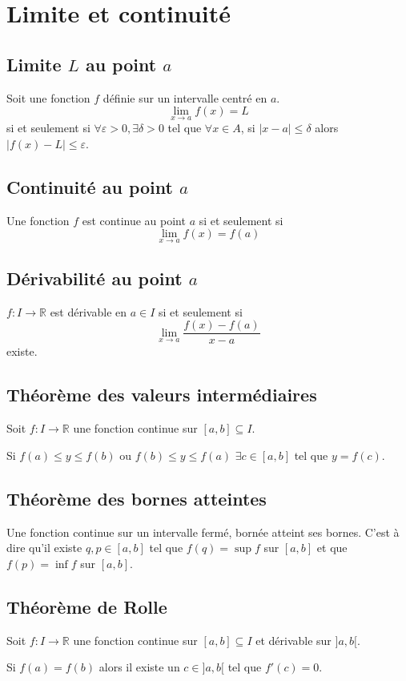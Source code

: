 \section{Limite et continuité}
\subsection{Limite $L$ au point $a$}
Soit une fonction $f$ définie sur un intervalle centré en $a$.
\[ \lim_{x \to a} f(x) = L \]
si et seulement si
$\forall \varepsilon > 0, \exists \delta > 0$ tel que
$\forall x \in A$, si $|x - a| \leq \delta$ alors
$|f(x) - L| \leq \varepsilon$.

\subsection{Continuité au point $a$}
Une fonction $f$ est continue au point $a$ si et seulement si
\[ \lim_{x \to a} f(x) = f(a) \]

\subsection{Dérivabilité au point $a$}
$f : I \to \mathbb{R}$ est dérivable en $a \in I$ si et seulement si
\[ \lim_{x \to a} \frac{f(x) - f(a)}{x - a} \]
existe.

\subsection{Théorème des valeurs intermédiaires}
Soit $f : I \to \mathbb{R}$ une fonction continue sur $[a,b] \subseteq I$.

Si $f(a) \leq y \leq f(b)$ ou $f(b) \leq y \leq f(a)$
$\exists c \in [a,b]$ tel que $y = f(c)$.

\subsection{Théorème des bornes atteintes}
Une fonction continue sur un intervalle fermé, bornée atteint ses bornes.
C'est à dire qu'il existe $q, p \in [a,b]$ tel que
$f(q) = \sup f$ sur $[a,b]$
et que $f(p) = \inf f$ sur $[a,b]$.

\subsection{Théorème de Rolle}
Soit $f:I \to \mathbb{R}$ une fonction continue sur $[a,b] \subseteq I$ et dérivable sur $]a,b[$.

Si $f(a) = f(b)$ alors il existe un $c \in ]a,b[$ tel que $f'(c) = 0$.

